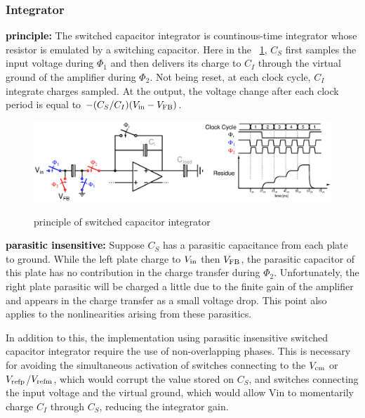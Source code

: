 	\subsubsection{Integrator}              %
\textbf{\textcolor{black}{principle:}}
The switched capacitor integrator is countinous-time integrator whose resistor is emulated by a switching capacitor. Here in the \figurename~\ref{fig:sigma-delta-integration}, $C_S$ first samples the input voltage during $\Phi_1$ and then delivers its charge to $C_I$ through the virtual ground of the amplifier during $\Phi_2$. Not being reset, at each clock cycle, $C_I$ integrate charges sampled. At the output, the voltage change after each clock period is equal to $-(C_S/C_I)(V_{\rm in} - V_{\rm FB})$.

\begin{figure}[htp]
	\centering
	\includegraphics[width=\textwidth]{Chapter4/Figs/sigma-delta-integration.ps}
	\begin{subfigure}[b]{0.48\textwidth}
		\centering
	\end{subfigure}
	\begin{subfigure}[b]{0.48\textwidth}
		\centering
	\end{subfigure}
	\caption{principle of switched capacitor integrator}
	\label{fig:sigma-delta-integration}
\end{figure}

\textbf{\textcolor{black}{parasitic insensitive:}}
Suppose $C_S$ has a parasitic capacitance from each plate to ground. While the left plate charge to $V_{\rm in}$ then $V_{\rm FB}$, the parasitic capacitor of this plate has no contribution in the charge transfer during $\Phi_2$. Unfortunately, the right plate parasitic will be charged a little due to the finite gain of the amplifier and appears in the charge transfer as a small voltage drop. This point also applies to the nonlinearities arising from these parasitics.

In addition to this, the implementation using parasitic insensitive switched capacitor integrator require the use of non-overlapping phases. This is necessary for avoiding the simultaneous activation of switches connecting to the $V_{\rm cm}$ or $V_{\rm refp}$/$V_{\rm refm}$, which would corrupt the value stored on $C_S$, and
switches connecting the input voltage and the virtual ground, which would allow Vin to momentarily charge $C_I$ through $C_S$, reducing the integrator gain. 


